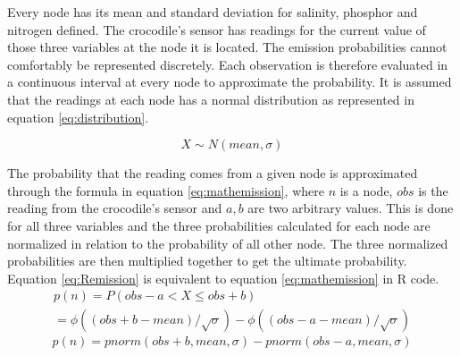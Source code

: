 \documentclass[12pt, a4paper]{article}
\begin{document}
Every node has its mean and standard deviation for salinity, phosphor and nitrogen defined. The crocodile's sensor has readings for the current value of those three variables at the node it is located. The emission probabilities cannot comfortably be represented discretely. Each observation is therefore evaluated in a continuous interval at every node to approximate the probability. It is assumed that the readings at each node has a normal distribution as represented in equation \ref{eq:distribution}.

\begin{equation}\label{eq:distribution}
X \sim N(mean,\sigma)
\end{equation}

The probability that the reading comes from a given node is approximated through the formula in equation \ref{eq:mathemission}, where $n$ is a node, $obs$ is the reading from the crocodile's sensor and $a,b$ are two arbitrary values. This is done for all three variables and the three probabilities calculated for each node are normalized in relation to the probability of all other node. The three normalized probabilities are then multiplied together to get the ultimate probability. Equation \ref{eq:Remission} is equivalent to equation \ref{eq:mathemission} in R code.
\begin{equation}\label{eq:mathemission}
\begin{split}
p(n) = P(obs-a < X \le obs+b) \hspace{137pt}
\\
=\phi((obs+b-mean)/\sqrt{\sigma})-\phi((obs-a-mean)/\sqrt{\sigma})
\end{split}
\end{equation}
\begin{equation}\label{eq:Remission}
p(n) = pnorm(obs+b,mean,\sigma)-pnorm(obs-a,mean,\sigma)
\end{equation}
\end{document}
